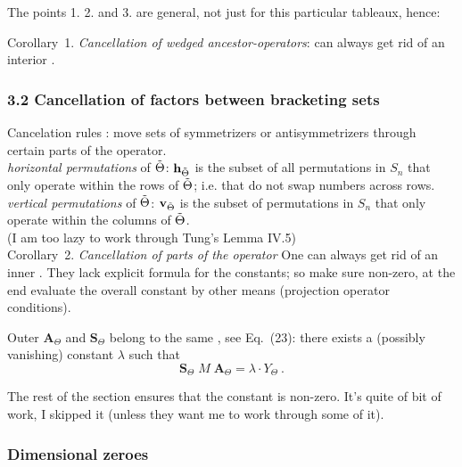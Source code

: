 The points 1. 2. and 3. are general, not just for this particular tableaux,
hence:

Corollary~1. {\em Cancellation of wedged ancestor-operators}:
can always get rid of an interior \Ypo.

\subsubsection{%
3.2 Cancellation of factors between bracketing sets}

Cancelation rules :
move sets of symmetrizers or antisymmetrizers
through certain parts of the operator.
\\

\noindent\emph{horizontal permutations} of $\Tilde{\Theta}$:
$\mathbf{h}_{\Tilde{\Theta}}$ is the subset of all permutations in
  $S_n$ that only operate within the rows of $\Tilde{\Theta}$; i.e. that do
  not swap numbers across rows. \\
\emph{vertical permutations} of $\Tilde{\Theta}$:
  $\mathbf{v}_{\Tilde{\Theta}}$ is the subset of permutations in $S_n$
  that only operate within the columns of $\Tilde{\Theta}$.
\\

(I am too lazy to work through Tung's Lemma IV.5)
\\


Corollary~2. {\em Cancellation of parts of the operator}
One can always get rid of an inner \Ypo. They lack explicit formula
for the constants; so make sure non-zero, at the end evaluate
the overall constant by other means (projection operator conditions).

Outer $\mathbf{A}_{\Theta}$ and $\mathbf{S}_{\Theta}$ belong to the same
\Ypo, see Eq.~(23): there exists a (possibly vanishing)
constant $\lambda$ such that
  \begin{equation}
    \label{eq:Cancel-General-O}
\mathbf{S}_{\Theta} \; M \; \mathbf{A}_{\Theta} =
\lambda \cdot Y_{\Theta}
\ .
  \end{equation}

The rest of the section  ensures that the constant is non-zero. It's quite of
bit of work, I skipped it (unless they want me to work through some of it).

\subsubsection{%
Dimensional zeroes}

